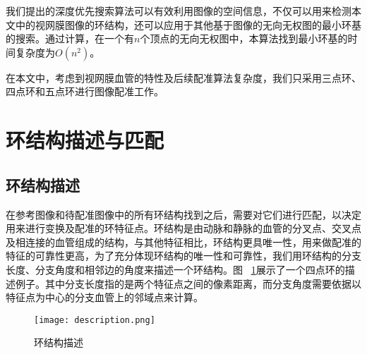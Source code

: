 我们提出的深度优先搜索算法可以有效利用图像的空间信息，不仅可以用来检测本文中的视网膜图像的环结构，还可以应用于其他基于图像的无向无权图的最小环基的搜索。通过计算，在一个有$n$个顶点的无向无权图中，本算法找到最小环基的时间复杂度为$O(n^2)$。

在本文中，考虑到视网膜血管的特性及后续配准算法复杂度，我们只采用三点环、四点环和五点环进行图像配准工作。

\section{环结构描述与匹配}
\subsection{环结构描述}
在参考图像和待配准图像中的所有环结构找到之后，需要对它们进行匹配，以决定用来进行变换及配准的环特征点。环结构是由动脉和静脉的血管的分叉点、交叉点及相连接的血管组成的结构，与其他特征相比，环结构更具唯一性，用来做配准的特征的可靠性更高，为了充分体现环结构的唯一性和可靠性，我们用环结构的分支长度、分支角度和相邻边的角度来描述一个环结构。图 ~\ref{descri}展示了一个四点环的描述例子。其中分支长度指的是两个特征点之间的像素距离，而分支角度需要依据以特征点为中心的分支血管上的邻域点来计算。
   \begin{figure}[ht!]
   \centering
  \texttt{[image: description.png]}
  \caption{环结构描述}
    \label{descri}
 \end{figure}

